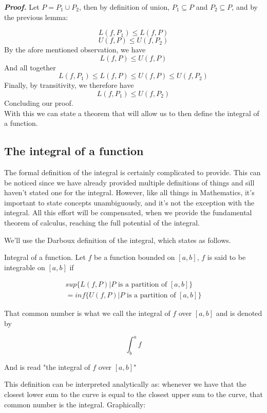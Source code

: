 \documentclass{report}
\begin{document}
    \textit{\textbf{Proof.}} Let $P = P_1 \cup P_2$, then by definition of union, $P_1 \subseteq P$ and $P_2 \subseteq P$, and by the previous lemma:

    $$L(f, P_1) \leq L(f, P)$$
    $$U(f, P) \leq U(f, P_2)$$
    By the afore mentioned observation, we have
    $$L(f, P) \leq U(f, P)$$
    And all together
    $$L(f, P_1) \leq L(f, P) \leq U(f, P) \leq U(f, P_2)$$
    Finally, by transitivity, we therefore have
    $$L(f, P_1) \leq U(f, P_2)$$
    Concluding our proof.\\

    With this we can state a theorem that will allow us to then define the integral of a function.
    \subsection*{The integral of a function}

    The formal definition of the integral is certainly complicated to provide. This can be noticed since we have already provided multiple definitions of things and sill haven't stated one for the integral. However, like all things in Mathematics, it's important to state concepts unambiguously, and it's not the exception with the integral. All this effort will be compensated, when we provide the fundamental theorem of calculus, reaching the full potential of the integral.

    We'll use the Darboux definition of the integral, which states as follows.
    \begin{defBox}
        Integral of a function. Let $f$ be a function bounded on $[a,b]$, $f$ is said to be integrable on $[a,b]$ if


        \begin{align*}
            sup\{L(f,P) | P \text{ is a partition of } [a,b]\}\\
            = inf\{U(f,P) | P \text{ is a partition of } [a,b]\}
        \end{align*}

        That common number is what we call the integral of $f$ over $[a,b]$ and is denoted by

        $$\int_{b}^{a}f$$

        And is read "the integral of $f$ over $[a,b]$"
    \end{defBox}

    This definition can be interpreted analytically as: whenever we have that the closest lower sum to the curve is equal to the closest upper sum to the curve, that common number is the integral. Graphically:
\end{document}
